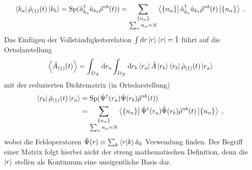 \begin{equation}
  \bra{k_a}{\hat{\rho}}_{(1)}(t)\ket{k_b} = \text{Sp} (\hat{a}^{\dagger}_{k_a}\hat{a}_{k_b} \hat{\rho}^{nb}(t))
  = \sum_{\substack{\{n_{\alpha}\} \\ \sum_{\alpha} n_{\alpha} = N}} \bra{\{n_{\alpha}\}} \hat{a}^{\dagger}_{k_a}\hat{a}_{k_b} \hat{\rho}^{nb}(t) \ket{\{n_{\alpha}\}} \; .
  \label{eq:redDichteOp}
\end{equation}
Das Einfügen der Vollständigkeitsrelation $\int \mathop{}\!\mathrm{d} r \ket{r}\bra{r} = \hat{1}$ führt auf die Ortsdarstellung
\begin{equation}
  \expval{\hat{A}_{(1)}(t)} = \int_{D_X} \mathop{}\!\mathrm{d} r_a \int_{D_X} \mathop{}\!\mathrm{d} r_b \bra{r_a}\hat{A}\ket{r_b} \bra{r_b}\hat{\rho}_{(1)}(t) \ket{r_a}
  \label{eq:expval_red}
\end{equation}
mit der reduzierten Dichtematrix (in Ortsdarstellung)
\begin{equation}
\begin{aligned}
  \bra{r_b}\hat{\rho}_{(1)}(t) \ket{r_a} &= \text{Sp}(\hat{\Psi}^{\dagger}(r_a)\hat{\Psi}(r_b)\hat{\rho}^{nb}(t)) \\
   &= \sum_{\substack{\{n_{\alpha}\} \\ \sum_{\alpha} n_{\alpha} = N}} \bra{\{n_{\alpha}\}} \hat{\Psi}^{\dagger}(r_a)\hat{\Psi}(r_b)\hat{\rho}^{nb}(t) \ket{\{n_{\alpha}\}} \; ,
\end{aligned}
\label{eq:def_dichtematrix}
\end{equation}
wobei die Feldoperatoren $\hat{\Psi}(r) \equiv \sum_{k} \bra{r}\ket{k}\hat{a}_k$ Verwendung finden. Der Begriff einer Matrix folgt hierbei nicht der streng mathematischen Definition, denn die $\ket{r}$ stellen als Kontinuum eine uneigentliche Basis dar.

